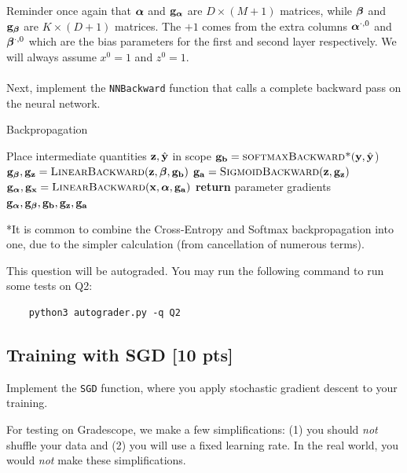 Reminder once again that $\boldsymbol \alpha$ and $\mathbf{g}_{\boldsymbol \alpha}$ are $D \times (M+1)$ matrices, while $\boldsymbol \beta$ and $\mathbf{g}_{\boldsymbol \beta}$ are $K \times (D+1)$ matrices. The $+1$ comes from the extra columns $\boldsymbol \alpha^{\cdot, 0}$ and $\boldsymbol \beta^{\cdot, 0}$ which are the bias parameters for the first and second layer respectively. We will always assume $x^0 = 1$ and $z^0 = 1$. 
\\\\ Next, implement the \texttt{NNBackward} function that calls a complete backward pass on the neural network.
\begin{algorithm}[H]
  \caption{Backpropagation}
  \label{alg:backpropmodule}
  \begin{algorithmic}[1] %
      \State Place intermediate quantities $\mathbf{z}, \hat{\mathbf{y}}$ in scope
      \State $\gv_{\bv} = \textproc{softmaxBackward*}(\yv, \hat{\yv}$)
      \State $\gv_{\betav}, \gv_{\zv} = \textproc{LinearBackward}(\zv, \betav, \gv_{\bv})$
      \State $\gv_{\av} = \textproc{SigmoidBackward}(\zv, \gv_{\zv})$
      \State $\gv_{\alphav}, \gv_{\xv} = \textproc{LinearBackward}(\xv, \alphav, \gv_{\av})$ 
      \State \textbf{return} parameter gradients $\mathbf{g}_{\boldsymbol \alpha}, \mathbf{g}_{\boldsymbol \beta}, \mathbf{g}_{\mathbf{b}}, \mathbf{g}_{\mathbf{z}}, \mathbf{g}_{\mathbf{a}}$
    \EndProcedure
  \end{algorithmic}
  *It is common to combine the Cross-Entropy and Softmax backpropagation into one, due to the simpler calculation (from cancellation of numerous terms). 
\end{algorithm}
This question will be autograded. You may run the following command to run some tests on Q2:
\begin{verbatim}
    python3 autograder.py -q Q2
\end{verbatim}
\vspace{0.3in}
\subsection{Training with SGD [10 pts]}
\label{sec:sgd}
Implement the \texttt{SGD} function, where you apply stochastic gradient descent to your training. 

For testing on Gradescope, we make a few simplifications: (1) you should \emph{not} shuffle your data and (2) you will use a fixed learning rate. In the real world, you would \emph{not} make these simplifications. 

